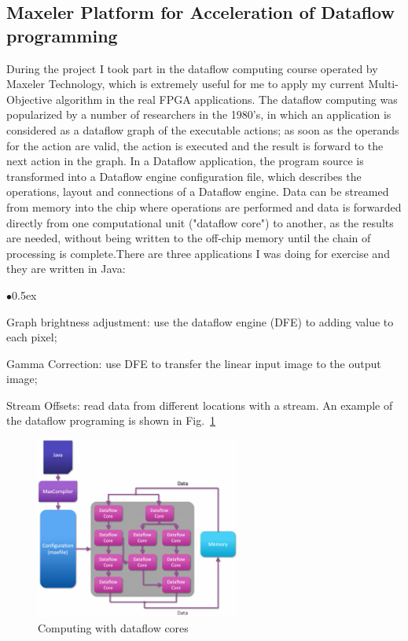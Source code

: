 \documentclass[11pt, runningheads,a4paper]{llncs}
\begin{document}
\subsection{Maxeler Platform for Acceleration of Dataflow programming}
During the project I took part in the dataflow computing course operated by Maxeler Technology, which is extremely useful for me to apply my current Multi-Objective algorithm in the real FPGA applications. The dataflow computing was popularized by a number of researchers in the 1980's, in which an application is considered as a dataflow graph of the executable actions; as soon as the operands for the action are valid, the action is executed and the result is forward to the next action in the graph. In a Dataflow application, the program source is transformed into a Dataflow engine configuration file, which describes the operations, layout and connections of a Dataflow engine. Data can be streamed from memory into the chip where operations are performed and data is forwarded directly from one computational unit ("dataflow core") to another, as the results are needed, without being written to the off-chip memory until the chain of processing is complete.There are three applications I was doing for exercise and they are written in Java: 
\begin{list}{$\bullet$}{\itemsep 0.5ex}
\item Graph brightness adjustment: use the dataflow engine (DFE) to adding value to each pixel; 
\item Gamma Correction: use DFE to transfer the linear input image to the output image; 
\item Stream Offsets: read data from different locations with a stream. An example of the dataflow programing is shown in Fig.~\ref{fig:dfe}
\end{list}
 \begin{figure}
     \centering
\includegraphics[width=0.6\textwidth]{./figs/DFE.png}
        \caption{Computing with dataflow cores}     
           \label{fig:dfe}
  \end{figure} 
\end{document}
